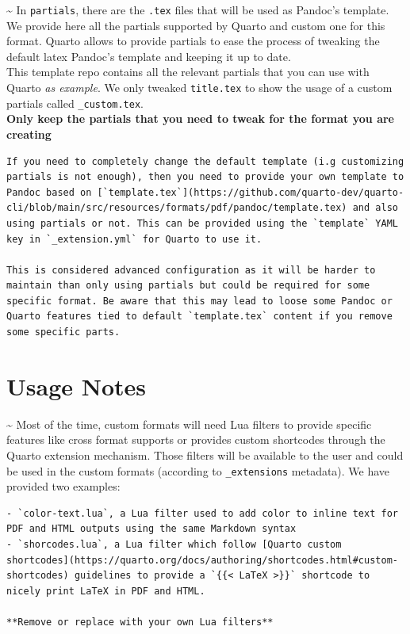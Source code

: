 \documentclass[fleqn,10pt]{wlscirep}
\begin{document}
\textasciitilde{} In \texttt{partials}, there are the \texttt{.tex}
files that will be used as Pandoc's template. We provide here all the
partials supported by Quarto and custom one for this format. Quarto
allows to provide partials to ease the process of tweaking the default
latex Pandoc's template and keeping it up to date.\\
This template repo contains all the relevant partials that you can use
with Quarto \emph{as example}. We only tweaked \texttt{title.tex} to
show the usage of a custom partials called \texttt{\_custom.tex}.\\
\textbf{Only keep the partials that you need to tweak for the format you
are creating}

\begin{verbatim}
If you need to completely change the default template (i.g customizing partials is not enough), then you need to provide your own template to Pandoc based on [`template.tex`](https://github.com/quarto-dev/quarto-cli/blob/main/src/resources/formats/pdf/pandoc/template.tex) and also using partials or not. This can be provided using the `template` YAML key in `_extension.yml` for Quarto to use it. 

This is considered advanced configuration as it will be harder to maintain than only using partials but could be required for some specific format. Be aware that this may lead to loose some Pandoc or Quarto features tied to default `template.tex` content if you remove some specific parts.
\end{verbatim}

\hypertarget{usage-notes-1}{%
\section{Usage Notes}\label{usage-notes-1}}

\textasciitilde{} Most of the time, custom formats will need Lua filters
to provide specific features like cross format supports or provides
custom shortcodes through the Quarto extension mechanism. Those filters
will be available to the user and could be used in the custom formats
(according to \texttt{\_extensions} metadata). We have provided two
examples:

\begin{verbatim}
- `color-text.lua`, a Lua filter used to add color to inline text for PDF and HTML outputs using the same Markdown syntax
- `shorcodes.lua`, a Lua filter which follow [Quarto custom shortcodes](https://quarto.org/docs/authoring/shortcodes.html#custom-shortcodes) guidelines to provide a `{{< LaTeX >}}` shortcode to nicely print LaTeX in PDF and HTML. 

**Remove or replace with your own Lua filters**
\end{verbatim}
\end{document}
